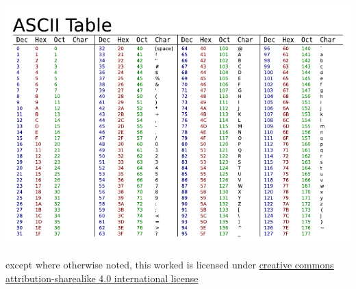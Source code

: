 \documentclass[10pt]{beamer}
\begin{document}
  \begin{frame}
    \includegraphics[width=\textwidth]{Ascii-proper-color}
  \end{frame}

  \begin{frame}
    \begin{center}\ccbysa\end{center}

    except where otherwise noted, this worked is licensed under
    \href{http://creativecommons.org/licenses/by-sa/4.0/}{creative commons
    attribution-sharealike 4.0 international license}
  \end{frame}
\end{document}
